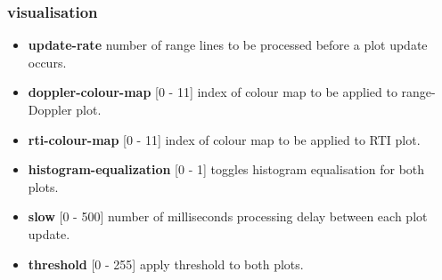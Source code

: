 \documentclass[a4paper,11pt]{report}
\begin{document}
\subsubsection{visualisation}
\begin{itemize}
  \item \textbf{update-rate} number of range lines to be processed before a plot update occurs.
  \item \textbf{doppler-colour-map} [0 - 11] index of colour map to be applied to range-Doppler plot. 
  \item \textbf{rti-colour-map} [0 - 11] index of colour map to be applied to RTI plot. 
  \item \textbf{histogram-equalization} [0 - 1] toggles histogram equalisation for both plots. 
  \item \textbf{slow} [0 - 500] number of milliseconds processing delay between each plot update. 
  \item \textbf{threshold} [0 - 255] apply threshold to both plots. 
\end{itemize}
\end{document}
